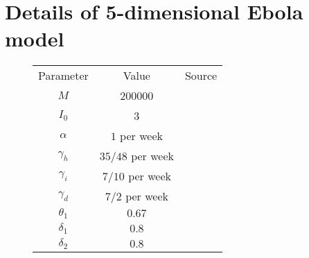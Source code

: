 \section{Details of 5-dimensional Ebola model}\label{app:ebola}
\begin{figure}
	\begin{center}
		\begin{tabular}{|c|c|p{7cm}|}
			\hline
			Parameter       & Value               & Source                                                                                                                                 \\ \hhline{|=|=|=|}
			\(M\)           & 200000              & \citet{DowellEtAl_1999_TransmissionEbolaHemorrhagic}                                                                                   \\ \hline
			\(I_0\)         & 3                   & \citet{KhanEtAl_1999_ReemergenceEbolaHemorrhagic}                                                                                      \\ \hline
			\(\alpha\)      & \(1\) per week      & \citet{DowellEtAl_1999_TransmissionEbolaHemorrhagic,BwakaEtAl_1999_EbolaHemorrhagicFever,NdambiEtAl_1999_EpidemiologicClinicalAspects} \\ \hline
			\(\gamma_h\)    & \(35/48\) per week  & \citet{KhanEtAl_1999_ReemergenceEbolaHemorrhagic}                                                                                      \\ \hline
			\(\gamma_i\)    & \(7 / 10\) per week & \citet{DowellEtAl_1999_TransmissionEbolaHemorrhagic,RoweEtAl_1999_ClinicalVirologicImmunologic}                                        \\
			\(\gamma_d\)    & \(7 / 2\) per week  & \citet{KhanEtAl_1999_ReemergenceEbolaHemorrhagic}                                                                                      \\ \hline
			\(\theta_1\)    & \(0.67\)            & \citet{KhanEtAl_1999_ReemergenceEbolaHemorrhagic}                                                                                      \\ \hline
			\(\delta_1\)    & \(0.8\)             & \citet{KhanEtAl_1999_ReemergenceEbolaHemorrhagic}                                                                                      \\ \hline
			\(\delta_2\)    & \(0.8\)             & \citet{KhanEtAl_1999_ReemergenceEbolaHemorrhagic}                                                                                      \\ \hline

\end{tabular}
\end{center}
\end{figure}
